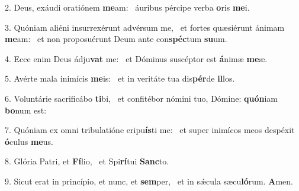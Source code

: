 2. Deus, exáudi oratiónem \textbf{me}am: \ast\  áuribus pércipe verba \textbf{o}ris \textbf{me}i.\

3. Quóniam aliéni insurrexérunt advérsum me, \dag\  et fortes quæsiérunt ánimam \textbf{me}am: \ast\  et non proposuérunt Deum ante con\textbf{spéc}tum \textbf{su}um.\

4. Ecce enim Deus ádju\textbf{vat} me: \ast\  et Dóminus suscéptor est \textbf{á}nimæ \textbf{me}æ.\

5. Avérte mala inimícis \textbf{me}is: \ast\  et in veritáte tua dis\textbf{pér}de \textbf{il}los.\

6. Voluntárie sacrificábo \textbf{ti}bi, \ast\  et confitébor nómini tuo, Dómine: \textbf{quón}iam \textbf{bo}num est:\

7. Quóniam ex omni tribulatióne eripu\textbf{ís}ti me: \ast\  et super inimícos meos despéxit \textbf{ó}culus \textbf{me}us.\

8. Glória Patri, et \textbf{Fí}lio, \ast\  et Spi\textbf{rí}tui \textbf{Sanc}to.\

9. Sicut erat in princípio, et nunc, et \textbf{sem}per, \ast\  et in sǽcula sæcu\textbf{ló}rum. \textbf{A}men.\

